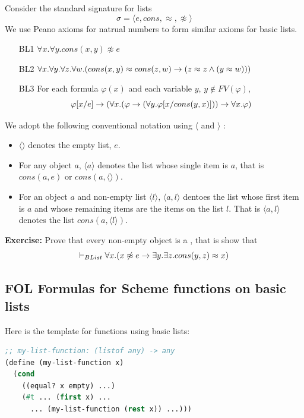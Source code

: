 \documentclass[english, 11pt]{article}
\begin{document}
    Consider the standard signature for lists
    \[ \sigma = \langle e, cons, \approx, \not \approx \rangle \]
    We use Peano axioms for natrual numbers to form similar axioms for basic lists.
    \begin{itemize}
      \item[BL1] $\forall x. \forall y. cons(x,y) \not \approx e$
      \item[BL2] $\forall x. \forall y. \forall z. \forall w.(cons(x,y) \approx cons(z,w) \rightarrow (z \approx z \land (y \approx w)))$
      \item[BL3] For each formula $\varphi(x)$ and each variable $y$, $y \not \in FV(\varphi)$,
      \[ \varphi[x/e] \rightarrow (\forall x. (\varphi \rightarrow (\forall y. \varphi[x/cons(y,x)])) \rightarrow \forall x. \varphi) \]
    \end{itemize}

    We adopt the following conventional notation using $\langle$ and $\rangle$ :
    \begin{itemize}
      \item $\langle \rangle$ denotes the empty list, $e$.
      \item For any object $a$, $\langle a \rangle$ denotes the list whose single item is $a$, that is $cons(a, e)$ or $cons(a, \langle \rangle)$.
      \item For an object $a$ and non-empty list $\langle l \rangle$, $\langle a, l \rangle$ dentoes the list whose first item is $a$ and whose remaining items are the items on the list $l$. That is $\langle a, l \rangle$ denotes the list $cons(a, \langle l \rangle)$.
    \end{itemize}

    \textbf{Exercise:} Prove that every non-empty object is a , that is show that
    \[ \vdash_{BList}\forall x. (x \not \approx e \rightarrow \exists y. \exists z. cons(y,z) \approx x) \]



    \subsection{FOL Formulas for Scheme functions on basic lists}

    Here is the template for functions using basic lists:
    \begin{lstlisting}[language=lisp]
;; my-list-function: (listof any) -> any
(define (my-list-function x)
  (cond
    ((equal? x empty) ...)
    (#t ... (first x) ...
      ... (my-list-function (rest x)) ...)))
    \end{lstlisting}
\end{document}
